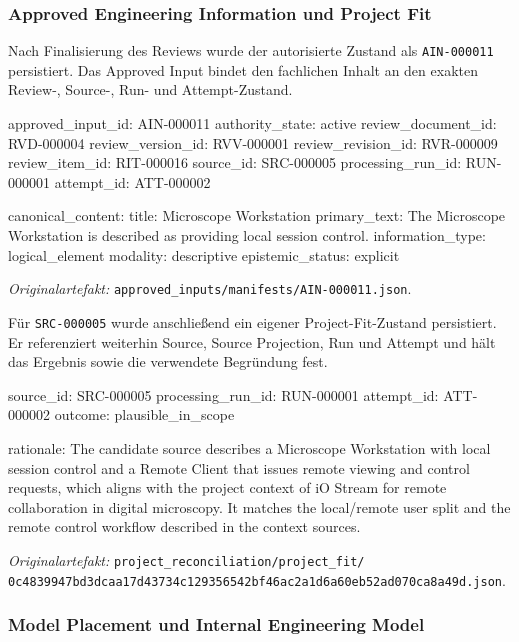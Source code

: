 \subsubsection{Approved Engineering Information und Project Fit}

Nach Finalisierung des Reviews wurde der autorisierte Zustand als
\texttt{AIN-000011} persistiert. Das Approved Input bindet den fachlichen
Inhalt an den exakten Review-, Source-, Run- und Attempt-Zustand.

\begin{evidencebox}
approved_input_id:      AIN-000011
authority_state:        active
review_document_id:     RVD-000004
review_version_id:      RVV-000001
review_revision_id:     RVR-000009
review_item_id:         RIT-000016
source_id:              SRC-000005
processing_run_id:      RUN-000001
attempt_id:             ATT-000002

canonical_content:
  title:                Microscope Workstation
  primary_text:         The Microscope Workstation is described as providing local session control.
  information_type:     logical_element
  modality:             descriptive
  epistemic_status:     explicit
\end{evidencebox}

\noindent\textit{Originalartefakt:}
\texttt{approved\_inputs/manifests/AIN-000011.json}.

Für \texttt{SRC-000005} wurde anschließend ein eigener Project-Fit-Zustand
persistiert. Er referenziert weiterhin Source, Source Projection, Run und
Attempt und hält das Ergebnis sowie die verwendete Begründung fest.

\begin{evidencebox}
source_id:         SRC-000005
processing_run_id: RUN-000001
attempt_id:        ATT-000002
outcome:           plausible_in_scope

rationale:
The candidate source describes a Microscope Workstation with local session
control and a Remote Client that issues remote viewing and control requests,
which aligns with the project context of iO Stream for remote collaboration
in digital microscopy. It matches the local/remote user split and the remote
control workflow described in the context sources.
\end{evidencebox}

\noindent\textit{Originalartefakt:}
\texttt{project\_reconciliation/project\_fit/}
\texttt{0c4839947bd3dcaa17d43734c129356542bf46ac2a1d6a60eb52ad070ca8a49d.json}.

\subsubsection{Model Placement und Internal Engineering Model}

